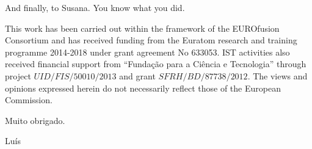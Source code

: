 And finally, to Susana. You know what you did.

\vspace{5mm}

This work has been carried out within the framework of the EUROfusion Consortium and has received funding from the Euratom research and training programme 2014-2018 under grant agreement No 633053. IST activities also received financial support from ``Funda\c{c}\~ao para a Ci\^{e}ncia e Tecnologia'' through project $UID/FIS/50010/2013$ and grant $SFRH/BD/87738/2012$. The views and opinions expressed herein do not necessarily reflect those of the European Commission.

\begin{flushright}
Muito obrigado.

Luís
\end{flushright}